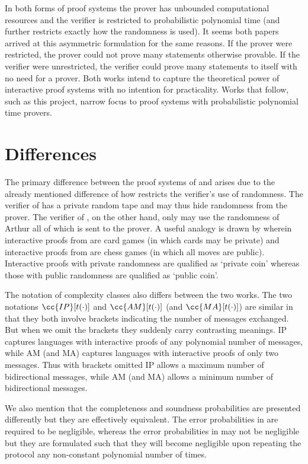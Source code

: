 In both forms of proof systems the prover has unbounded computational resources and the verifier is restricted to probabilistic polynomial time (and \cite{Bab85} further restricts exactly how the randomness is used).
It seems both papers arrived at this asymmetric formulation for the same reasons.
If the prover were restricted, the prover could not prove many statements otherwise provable.
If the verifier were unrestricted, the verifier could prove many statements to itself with no need for a prover.
Both works intend to capture the theoretical power of interactive proof systems with no intention for practicality.
Works that follow, such as this project, narrow focus to proof systems with probabilistic polynomial time provers.


\section{Differences}

The primary difference between the proof systems of \cite{Bab85} and \cite{GMR85} arises due to the already mentioned difference of how \cite{Bab85} restricts the verifier's use of randomness.
The verifier of \cite{GMR85} has a private random tape and may thus hide randomness from the prover.
The verifier of \cite{Bab85}, on the other hand, only may use the randomness of Arthur all of which is sent to the prover.
A useful analogy is drawn by \cite{Bab85} wherein interactive proofs from \cite{GMR85} are card games (in which cards may be private) and interactive proofs from \cite{Bab85} are chess games (in which all moves are public).
Interactive proofs with private randomness are qualified as `private coin' whereas those with public randomness are qualified as `public coin'.

The notation of complexity classes also differs between the two works.
The two notations $\cc{IP}[t(\cdot)]$ and $\cc{AM}[t(\cdot)]$ (and $\cc{MA}[t(\cdot)]$) are similar in that they both involve brackets indicating the number of messages exchanged.
But when we omit the brackets they suddenly carry contrasting meanings.
IP captures languages with interactive proofs of any polynomial number of messages, while AM (and MA) captures languages with interactive proofs of only two messages.
Thus with brackets omitted IP allows a maximum number of bidirectional messages, while AM (and MA) allows a minimum number of bidirectional messages.

We also mention that the completeness and soundness probabilities are presented differently but they are effectively equivalent.
The error probabilities in \cite{GMR85} are required to be negligible, whereas the error probabilities in \cite{GMR85} may not be negligible but they are formulated such that they will become negligible upon repeating the protocol any non-constant polynomial number of times.


